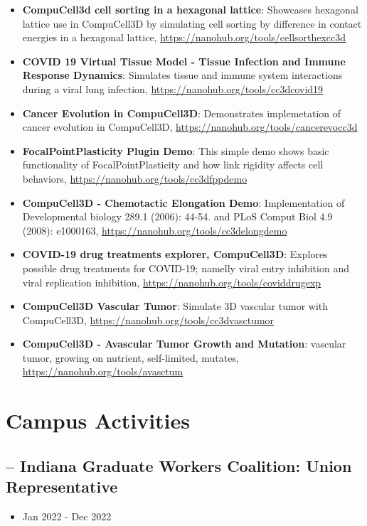 \begin{itemize}
    \item \textbf{CompuCell3d cell sorting in a hexagonal lattice}: Showcases hexagonal lattice use in CompuCell3D by simulating cell sorting by difference in contact energies in a hexagonal lattice, \url{https://nanohub.org/tools/cellsorthexcc3d}
    \item \textbf{COVID 19 Virtual Tissue Model - Tissue Infection and Immune Response Dynamics}: Simulates tissue and immune system interactions during a viral lung infection, \url{https://nanohub.org/tools/cc3dcovid19}
    \item \textbf{Cancer Evolution in CompuCell3D}: Demonstrates implemetation of cancer evolution in CompuCell3D, \url{https://nanohub.org/tools/cancerevocc3d}
    \item \textbf{FocalPointPlasticity Plugin Demo}: This simple demo shows basic functionality of FocalPointPlasticity and how link rigidity affects cell behaviors, \url{https://nanohub.org/tools/cc3dfppdemo}
    \item \textbf{CompuCell3D - Chemotactic Elongation Demo}: Implementation of Developmental biology 289.1 (2006): 44-54. and PLoS Comput Biol 4.9 (2008): e1000163, \url{https://nanohub.org/tools/cc3delongdemo}
    \item \textbf{COVID-19 drug treatments explorer, CompuCell3D}: Explores possible drug treatments for COVID-19; namelly viral entry inhibition and viral replication inhibition, \url{https://nanohub.org/tools/coviddrugexp}
    \item \textbf{CompuCell3D Vascular Tumor}: Simulate 3D vascular tumor with CompuCell3D, \url{https://nanohub.org/tools/cc3dvasctumor}
    \item \textbf{CompuCell3D - Avascular Tumor Growth and Mutation}: vascular tumor, growing on nutrient, self-limited, mutates, \url{https://nanohub.org/tools/avasctum}
\end{itemize}



\section*{Campus Activities}
\subsection*{-- Indiana Graduate Workers Coalition: Union Representative}
\begin{itemize}\setlength\itemsep{-.9em}
    \item Jan 2022 - Dec 2022
\end{itemize}

